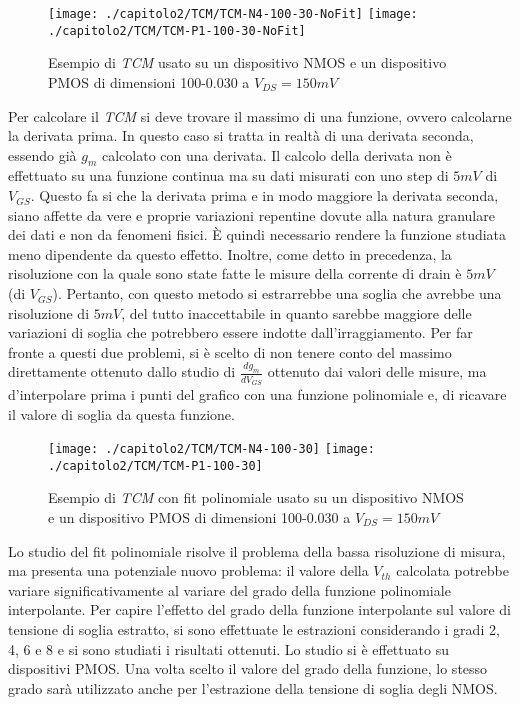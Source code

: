 \begin{figure}[h!]
  \centering
  \texttt{[image: ./capitolo2/TCM/TCM-N4-100-30-NoFit]}
  \texttt{[image: ./capitolo2/TCM/TCM-P1-100-30-NoFit]}
  \caption[Applicazione TCM senza fit polinomiale]{Esempio di \emph{TCM} usato su un dispositivo NMOS e un dispositivo PMOS di dimensioni 100-0.030 a $V_{DS} = 150 mV$}
\end{figure}

Per calcolare il \emph{TCM} si deve trovare il massimo di una funzione, ovvero calcolarne la derivata prima. In questo caso si tratta in realtà di una derivata seconda, essendo già $g_m$ calcolato con una derivata. Il calcolo della derivata non è effettuato su una funzione continua ma su dati misurati con uno step di $5mV$ di $V_{GS}$. Questo fa si che la derivata prima e in modo maggiore la derivata seconda, siano affette da vere e proprie variazioni repentine dovute alla natura granulare dei dati e non da fenomeni fisici. È quindi necessario rendere la funzione studiata meno dipendente da questo effetto. Inoltre, come detto in precedenza, la risoluzione con la quale sono state fatte le misure della corrente di drain è $5mV$ (di $V_{GS}$). Pertanto, con questo metodo si estrarrebbe una soglia che avrebbe una risoluzione di $5mV$, del tutto inaccettabile in quanto sarebbe maggiore delle variazioni di soglia che potrebbero essere indotte dall'irraggiamento.
Per far fronte a questi due problemi, si è scelto di non tenere conto del massimo direttamente ottenuto dallo studio di $\frac{dg_m}{dV_{GS}}$ ottenuto dai valori delle misure, ma d'interpolare prima i punti del grafico con una funzione polinomiale e, di ricavare il valore di soglia da questa funzione.

\begin{figure}[H]
  \centering
  \texttt{[image: ./capitolo2/TCM/TCM-N4-100-30]}
  \texttt{[image: ./capitolo2/TCM/TCM-P1-100-30]}
  \caption[Applicazione TCM con fit polinomiale di sesto grado]{Esempio di \emph{TCM} con fit polinomiale usato su un dispositivo NMOS e un dispositivo PMOS di dimensioni 100-0.030 a $V_{DS} = 150 mV$}
\end{figure}

Lo studio del fit polinomiale risolve il problema della bassa risoluzione di misura, ma presenta una potenziale nuovo problema: il valore della $V_{th}$ calcolata potrebbe variare significativamente al variare del grado della funzione polinomiale interpolante. Per capire l'effetto del grado della funzione interpolante sul valore di tensione di soglia estratto, si sono effettuate le estrazioni considerando i gradi 2, 4, 6 e 8 e si sono studiati i risultati ottenuti. Lo studio si è effettuato su dispositivi PMOS. Una volta scelto il valore del grado della funzione, lo stesso grado sarà utilizzato anche per l'estrazione della tensione di soglia degli NMOS.


